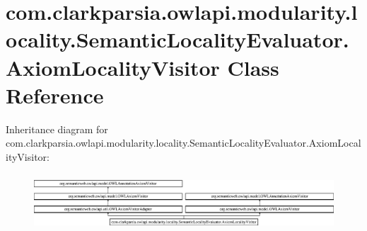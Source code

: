 \hypertarget{classcom_1_1clarkparsia_1_1owlapi_1_1modularity_1_1locality_1_1_semantic_locality_evaluator_1_1_axiom_locality_visitor}{\section{com.\-clarkparsia.\-owlapi.\-modularity.\-locality.\-Semantic\-Locality\-Evaluator.\-Axiom\-Locality\-Visitor Class Reference}
\label{classcom_1_1clarkparsia_1_1owlapi_1_1modularity_1_1locality_1_1_semantic_locality_evaluator_1_1_axiom_locality_visitor}
}
Inheritance diagram for com.\-clarkparsia.\-owlapi.\-modularity.\-locality.\-Semantic\-Locality\-Evaluator.\-Axiom\-Locality\-Visitor\-:\begin{figure}[H]
\begin{center}
\leavevmode
\includegraphics[height=2.125237cm]{classcom_1_1clarkparsia_1_1owlapi_1_1modularity_1_1locality_1_1_semantic_locality_evaluator_1_1_axiom_locality_visitor}
\end{center}
\end{figure}
